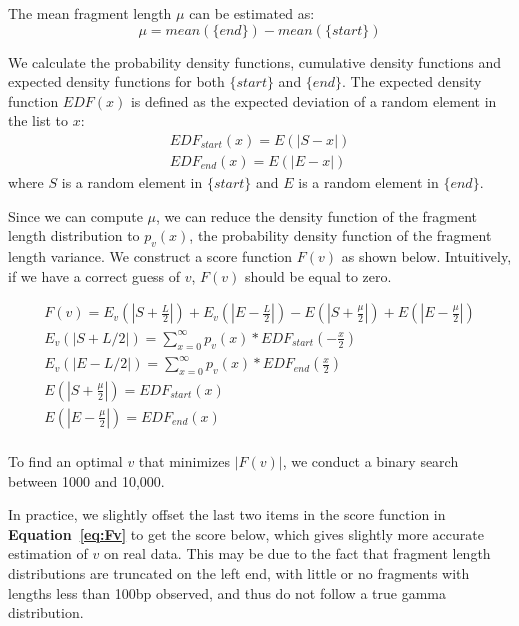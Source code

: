 \documentclass[12pt]{article}
\begin{document}
The mean fragment length $\mu$ can be estimated as:
\begin{equation}
  \mu = mean(\{end\}) - mean(\{start\})
\end{equation}

We calculate the probability density functions, cumulative density functions and expected density functions for both $\{start\}$ and $\{end\}$.
The expected density function $EDF(x)$ is defined as the expected deviation of a random element in the list to $x$:
\begin{equation} \label{eq:EDF}
  \begin{array}{c} 
    EDF_{start}(x) = E(|S - x|) \\
    EDF_{end}(x) = E(|E - x|)
    \end{array}
\end{equation}
where $S$ is a random element in $\{start\}$ and $E$ is a random element in $\{end\}$.

Since we can compute $\mu$, we can reduce the density function of the fragment length distribution to $p_v(x)$, the probability density function of the fragment length variance. %
We construct a score function $F(v)$ as shown below.
Intuitively, if we have a correct guess of $v$, $F(v)$ should be equal to zero.

\begin{equation}
  \begin{array}{c} \label{eq:Fv}
F(v) = E_v(|S + \frac{L}{2}|) + E_v(|E - \frac{L}{2}|) - E(|S + \frac{\mu}{2}|) + E(|E- \frac{\mu}{2}|) \\
E_v(|S + L/2|) = \sum_{x=0}^\infty p_v(x) * EDF_{start}(-\frac{x}{2}) \\
E_v(|E - L/2|) = \sum_{x=0}^\infty p_v(x) * EDF_{end}(\frac{x}{2}) \\
E(|S + \frac{\mu}{2}|)=EDF_{start}(x) \\
E(|E - \frac{\mu}{2}|)=EDF_{end}(x) \\
\end{array}
\end{equation}

To find an optimal $v$ that minimizes $|F(v)|$, we conduct a binary search between 1000 and 10,000.

In practice, we slightly offset the last two items in the score function in \textbf{Equation~\ref{eq:Fv}} to get the score below, which gives slightly more accurate estimation of $v$ on real data.
This may be due to the fact that fragment length distributions are truncated on the left end, with little or no fragments with lengths less than 100bp observed, and thus do not follow a true gamma distribution.
\end{document}
